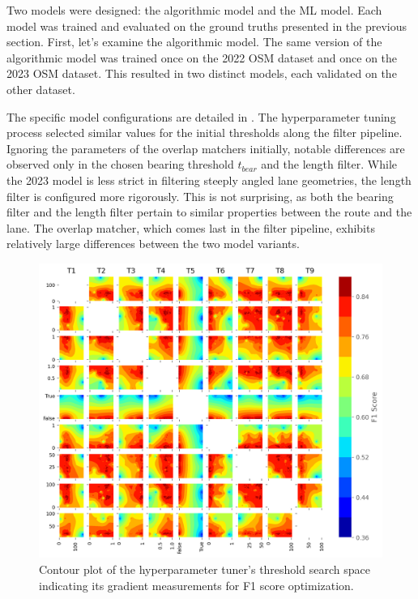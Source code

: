 Two models were designed: the algorithmic model and the ML model. Each model was trained and evaluated on the ground truths presented in the previous section. First, let's examine the algorithmic model. The same version of the algorithmic model was trained once on the 2022 OSM dataset and once on the 2023 OSM dataset. This resulted in two distinct models, each validated on the other dataset.

The specific model configurations are detailed in . The hyperparameter tuning process selected similar values for the initial thresholds along the filter pipeline. Ignoring the parameters of the overlap matchers initially, notable differences are observed only in the chosen bearing threshold $t_{bear}$ and the length filter. While the 2023 model is less strict in filtering steeply angled lane geometries, the length filter is configured more rigorously. This is not surprising, as both the bearing filter and the length filter pertain to similar properties between the route and the lane. The overlap matcher, which comes last in the filter pipeline, exhibits relatively large differences between the two model variants. 

\begin{figure}[htbp]
\centering 
\includegraphics[width=\linewidth]{images/matching-hpt-contour-topological-osm-updated.png}
\caption{Contour plot of the hyperparameter tuner's threshold search space indicating its gradient measurements for F1 score optimization.}
\label{fig:hyperparameter-contourplot}
\end{figure}

